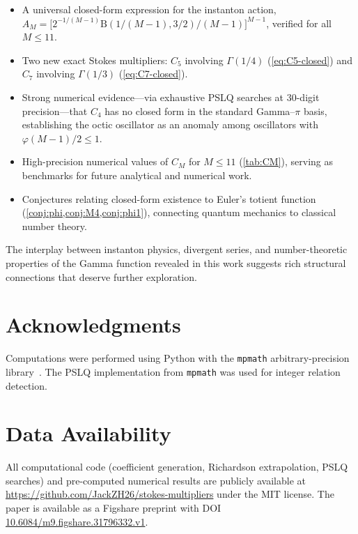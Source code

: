 \documentclass[12pt,a4paper]{article}
\numberwithin{equation}{section}
\theoremstyle{plain}
\theoremstyle{definition}
\theoremstyle{remark}
\newcommand{\BetaF}{\mathrm{B}}
\begin{document}
\begin{itemize}[leftmargin=*]
\item A universal closed-form expression for the instanton action,
  $A_M = \bigl[2^{-1/(M-1)} \BetaF(1/(M{-}1), 3/2)/(M{-}1)\bigr]^{M-1}$,
  verified for all $M \le 11$.

\item Two new exact Stokes multipliers: $C_5$ involving $\Gamma(1/4)$
  (\cref{eq:C5-closed}) and $C_7$ involving $\Gamma(1/3)$
  (\cref{eq:C7-closed}).

\item Strong numerical evidence---via exhaustive PSLQ searches at 30-digit
  precision---that $C_4$ has no closed form in the standard
  Gamma--$\pi$ basis, establishing the octic oscillator as an anomaly
  among oscillators with $\varphi(M{-}1)/2 \le 1$.

\item High-precision numerical values of $C_M$ for $M \le 11$
  (\cref{tab:CM}), serving as benchmarks for future analytical and
  numerical work.

\item Conjectures relating closed-form existence to Euler's totient
  function (\cref{conj:phi,conj:M4,conj:phi1}), connecting quantum
  mechanics to classical number theory.
\end{itemize}

The interplay between instanton physics, divergent series, and
number-theoretic properties of the Gamma function revealed in this work
suggests rich structural connections that deserve further exploration.

\section*{Acknowledgments}

Computations were performed using Python with the \texttt{mpmath}
arbitrary-precision library~\cite{mpmath}. The PSLQ implementation from
\texttt{mpmath} was used for integer relation detection.

\section*{Data Availability}

All computational code (coefficient generation, Richardson extrapolation,
PSLQ searches) and pre-computed numerical results are publicly available at
\url{https://github.com/JackZH26/stokes-multipliers} under the MIT license.
The paper is available as a Figshare preprint with DOI
\href{https://doi.org/10.6084/m9.figshare.31796332.v1}{10.6084/m9.figshare.31796332.v1}.
\end{document}
